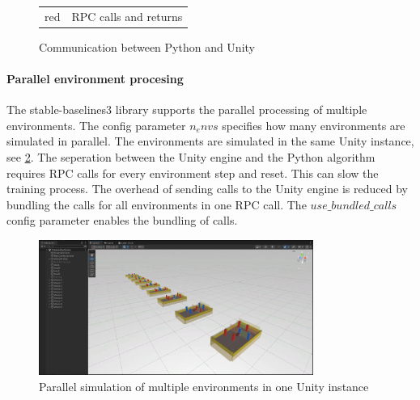 \begin{figure}[h]
    \begin{tabular}{r@{: }l}
        red & RPC calls and returns \\
    \end{tabular}
    \caption{Communication between Python and Unity}
    \label{fig:communication_python_unity}
\end{figure}


\paragraph{Parallel environment procesing}

The stable-baselines3 library supports the parallel processing of multiple environments. The config parameter $n_envs$ specifies how many environments are simulated in parallel. The environments are simulated in the same Unity instance, see \ref{fig:parallel_simulation_unity_instance}. The seperation between the Unity engine and the Python algorithm requires \acs{RPC} calls for every environment step and reset. This can slow the training process. The overhead of sending calls to the Unity engine is reduced by bundling the calls for all environments in one \acs{RPC} call. The $use\_bundled\_calls$ config parameter enables the bundling of calls.

\begin{figure}
    \centering
    \includegraphics[width=0.8\textwidth]{Bilder/parallel_simulation_unity_instance.png}
    \caption{Parallel simulation of multiple environments in one Unity instance}
    \label{fig:parallel_simulation_unity_instance}
\end{figure}


